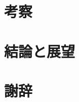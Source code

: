 \documentclass[a4paper,11pt,titlepage,openany]{jsbook}
\begin{document}

\frontmatter
	
	\setcounter{tocdepth}{2}
	\tableofcontents

\mainmatter %
	
	
	
	
	
	
	\chapter{考察}
	\chapter{結論と展望}

\backmatter
	\chapter{謝辞}
	\begin{thebibliography}{99}
	\end{thebibliography}
\end{document}
